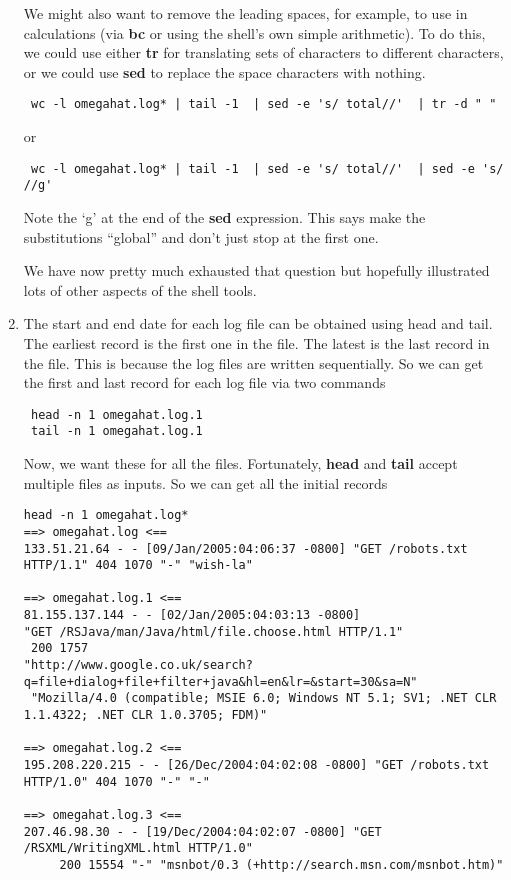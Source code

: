 \documentclass[10pt]{article}
\def\executable#1{\textbf{#1}}
\begin{document}
\begin{enumerate}
We might also want to remove the leading spaces,
for example, to use in calculations (via \executable{bc}
or using the shell's own simple arithmetic).
To do this, we could use either
\executable{tr} for translating sets of characters to different
characters, or we could use \executable{sed} to replace the
space characters with nothing.
\begin{verbatim}
 wc -l omegahat.log* | tail -1  | sed -e 's/ total//'  | tr -d " "
\end{verbatim}
or
\begin{verbatim}
 wc -l omegahat.log* | tail -1  | sed -e 's/ total//'  | sed -e 's/ //g'
\end{verbatim}
Note the `g' at the end of the \executable{sed} expression.
This says make the substitutions ``global'' and don't just stop
at the first one.

We have now pretty much exhausted that question but hopefully 
illustrated lots of other aspects of the shell tools.


\item The start and end date for each log file can be obtained using
head and tail. 
The earliest record is the first one in the file.
The latest is the last record in the file.
This is because the log files are written sequentially.
So we can get the first and last record for each log file
via two commands
\begin{verbatim}
 head -n 1 omegahat.log.1
 tail -n 1 omegahat.log.1
\end{verbatim}
Now, we want these for all the files.
Fortunately, \executable{head} and \executable{tail}
accept multiple files as inputs.
So we can get all the initial records
{\footnotesize
\begin{verbatim}
head -n 1 omegahat.log*
==> omegahat.log <==
133.51.21.64 - - [09/Jan/2005:04:06:37 -0800] "GET /robots.txt HTTP/1.1" 404 1070 "-" "wish-la"

==> omegahat.log.1 <==
81.155.137.144 - - [02/Jan/2005:04:03:13 -0800] 
"GET /RSJava/man/Java/html/file.choose.html HTTP/1.1" 
 200 1757 
"http://www.google.co.uk/search?q=file+dialog+file+filter+java&hl=en&lr=&start=30&sa=N" 
 "Mozilla/4.0 (compatible; MSIE 6.0; Windows NT 5.1; SV1; .NET CLR 1.1.4322; .NET CLR 1.0.3705; FDM)"

==> omegahat.log.2 <==
195.208.220.215 - - [26/Dec/2004:04:02:08 -0800] "GET /robots.txt HTTP/1.0" 404 1070 "-" "-"

==> omegahat.log.3 <==
207.46.98.30 - - [19/Dec/2004:04:02:07 -0800] "GET /RSXML/WritingXML.html HTTP/1.0"
     200 15554 "-" "msnbot/0.3 (+http://search.msn.com/msnbot.htm)"


\end{verbatim}}
\end{enumerate}
\end{document}
